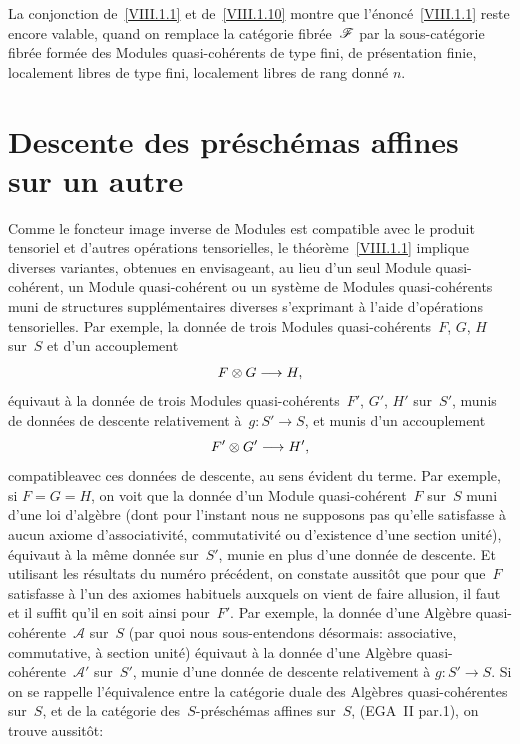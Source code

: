 \begin{remarque}
\label{VIII.1.12}
La conjonction de~\ref{VIII.1.1} et de~\ref{VIII.1.10} montre que
l'\'enonc\'e~\ref{VIII.1.1} reste encore valable, quand on
remplace la cat\'egorie fibr\'ee~$\cal{F}$ par la
sous-cat\'egorie fibr\'ee form\'ee des Modules
quasi-coh\'erents de type fini, \resp de pr\'esentation finie,
\resp localement libres de type fini, \resp localement libres de rang
donn\'e $n$.
\end{remarque}

\section{Descente des pr\'esch\'emas affines sur un autre}
\label{VIII.2}

Comme le foncteur image inverse de Modules est compatible avec le
produit tensoriel et d'autres op\'erations tensorielles, le
th\'eor\`eme~\ref{VIII.1.1} implique diverses variantes, obtenues
en envisageant, au lieu d'un seul Module quasi-coh\'erent, un Module
quasi-coh\'erent ou un syst\`eme de Modules quasi-coh\'erents
muni de structures suppl\'ementaires diverses s'exprimant \`a
l'aide d'op\'erations tensorielles. Par exemple, la donn\'ee de
trois Modules quasi-coh\'erents~$F$, $G$, $H$ sur~$S$ et d'un
accouplement
$$
F\otimes G\to H\quoi,
$$
\'equivaut \`a la donn\'ee de trois Modules
quasi-coh\'erents~$F'$, $G'$, $H'$ sur~$S'$, munis de donn\'ees de
descente relativement \`a~$g\colon S'\to S$, et munis d'un
accouplement
$$
F'\otimes G'\to H'\quoi,
$$
\og compatible\fg avec ces donn\'ees de descente, au sens \'evident
du terme. Par exemple, si $F=G=H$, on voit que la donn\'ee d'un
Module quasi-coh\'erent~$F$ sur~$S$ muni d'une loi d'alg\`ebre
(dont pour l'instant nous ne supposons pas qu'elle satisfasse \`a
aucun axiome d'associativit\'e, commutativit\'e ou d'existence
d'une section unit\'e), \'equivaut \`a la m\^eme donn\'ee
sur~$S'$, munie en plus d'une donn\'ee de descente. Et utilisant les
r\'esultats du num\'ero pr\'ec\'edent, on constate
aussit\^ot que pour que~$F$ satisfasse \`a l'un des axiomes
habituels auxquels on vient de faire allusion, il faut et il suffit
qu'il en soit ainsi pour~$F'$. Par exemple, la donn\'ee d'une
Alg\`ebre quasi-coh\'erente~$\mathcal{A}$ sur~$S$ (par quoi nous
sous-entendons d\'esormais: associative, commutative, \`a section
unit\'e) \'equivaut \`a la donn\'ee d'une Alg\`ebre
quasi-coh\'erente~$\mathcal{A}'$ sur~$S'$, munie d'une donn\'ee de
descente relativement \`a
$g\colon S'\to S$.
Si on se rappelle l'\'equivalence entre la cat\'egorie duale des
Alg\`ebres quasi-coh\'erentes sur~$S$, et de la cat\'egorie
des~$S$-pr\'esch\'emas affines sur~$S$, (EGA~II par.1), on trouve
aussit\^ot:

